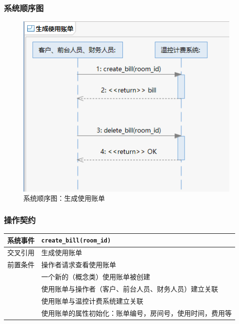 \documentclass[blue,normal,cn]{elegantnote}
\newcommand{\code}[1]{\colorbox{light-gray}{\texttt{#1}}}
\begin{document}
\subsubsection{系统顺序图}

\begin{figure}[H]
    \centering
    \includegraphics[width=.8\textwidth]{fig/276004.png}
    \caption{系统顺序图：生成使用账单}
    \label{fig:276004}
\end{figure}

\subsubsection{操作契约}

\begin{center}
    \begin{tabular}{|>{\centering}m{}|m{}|}
        \hline
        系统事件                  & \multicolumn{1}{l|}{\code{create\_bill(room\_id)}}       \\
        \hline
        交叉引用                  & 生成使用账单                                             \\
        \hline
        前置条件                  & 操作者请求查看使用账单                                   \\
        \hline
        \multirow{4}{*}{后置条件} & 一个新的（概念类）使用账单被创建                         \\
        \cline{2-2}
                                  & 使用账单与操作者（客户、前台人员、财务人员）建立关联     \\
        \cline{2-2}
                                  & 使用账单与温控计费系统建立关联                           \\
        \cline{2-2}
                                  & 使用账单的属性初始化：账单编号，房间号，使用时间，费用等 \\
        \hline
    \end{tabular}
\end{center}
\end{document}
